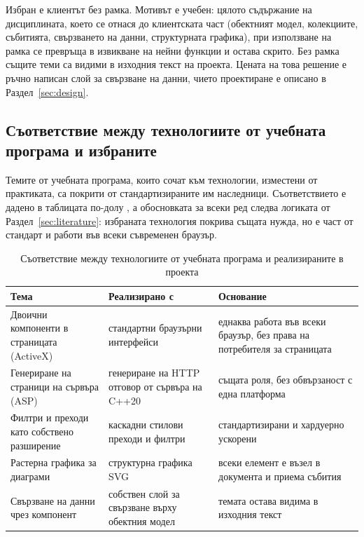 Избран е клиентът без рамка. Мотивът е учебен: цялото
съдържание на дисциплината, което се отнася до клиентската част (обектният модел,
колекциите, събитията, свързването на данни, структурната графика), при използване на
рамка се превръща в извикване на нейни функции и остава скрито. Без рамка същите теми са
видими в изходния текст на проекта. Цената на това решение е ръчно написан слой за
свързване на данни, чието проектиране е описано в Раздел~\ref{sec:design}.

\subsection{Съответствие между технологиите от учебната програма и избраните}

Темите от учебната програма, които сочат към технологии, изместени от практиката, са
покрити от стандартизираните им наследници. Съответствието е дадено в таблицата по-долу
, а обосновката за всеки ред следва
логиката от Раздел~\ref{sec:literature}: избраната технология покрива същата нужда, но е
част от стандарт и работи във всеки съвременен браузър.

\begin{table}[H]
\caption{Съответствие между технологиите от учебната програма и реализираните в проекта}
\label{tab:tech-mapping}
\centering
\fontsize{11}{13.2}\selectfont
\begin{tabular}{@{}L{4.2cm}L{4.2cm}L{4.6cm}@{}}
\toprule
\textbf{Тема} & \textbf{Реализирано с} & \textbf{Основание} \\
\midrule
Двоични компоненти в страницата (ActiveX) & стандартни браузърни интерфейси & еднаква работа във всеки браузър, без права на потребителя за страницата \\
Генериране на страници на сървъра (ASP) & генериране на HTTP отговор от сървъра на C++20 & същата роля, без обвързаност с една платформа \\
Филтри и преходи като собствено разширение & каскадни стилови преходи и филтри & стандартизирани и хардуерно ускорени \\
Растерна графика за диаграми & структурна графика SVG~\cite{svg2} & всеки елемент е възел в документа и приема събития \\
Свързване на данни чрез компонент & собствен слой за свързване върху обектния модел~\cite{dom_ls} & темата остава видима в изходния текст \\
\bottomrule
\end{tabular}
\end{table}

